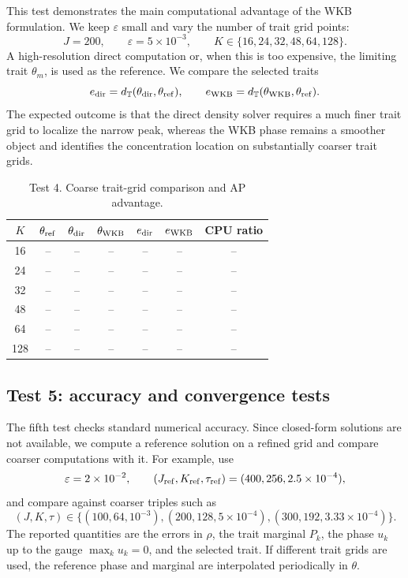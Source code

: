 \documentclass[11pt]{article}
\begin{document}
This test demonstrates the main computational advantage of the WKB formulation.  We keep \(\varepsilon\) small and vary the number of trait grid points:
\[
    J=200,
    \qquad
    \varepsilon=5\times10^{-3},
    \qquad
    K\in\{16,24,32,48,64,128\}.
\]
A high-resolution direct computation or, when this is too expensive, the limiting trait \(\theta_m\), is used as the reference.  We compare the selected traits
\[
    e_{\rm dir}=d_{\mathbb T}(\theta_{\rm dir},\theta_{\rm ref}),
    \qquad
    e_{\rm WKB}=d_{\mathbb T}(\theta_{\rm WKB},\theta_{\rm ref}).
\]
The expected outcome is that the direct density solver requires a much finer trait grid to localize the narrow peak, whereas the WKB phase remains a smoother object and identifies the concentration location on substantially coarser trait grids.

\begin{table}[ht]
\centering
\caption{Test 4. Coarse trait-grid comparison and AP advantage.}
\begin{tabular}{ccccccc}
\toprule
$K$ & $\theta_{\rm ref}$ & $\theta_{\rm dir}$ & $\theta_{\rm WKB}$ & $e_{\rm dir}$ & $e_{\rm WKB}$ & CPU ratio\\
\midrule
16 & -- & -- & -- & -- & -- & --\\
24 & -- & -- & -- & -- & -- & --\\
32 & -- & -- & -- & -- & -- & --\\
48 & -- & -- & -- & -- & -- & --\\
64 & -- & -- & -- & -- & -- & --\\
128 & -- & -- & -- & -- & -- & --\\
\bottomrule
\end{tabular}
\end{table}

\subsection{Test 5: accuracy and convergence tests}\label{subsec:test_accuracy_new}

The fifth test checks standard numerical accuracy.  Since closed-form solutions are not available, we compute a reference solution on a refined grid and compare coarser computations with it.  For example, use
\[
    \varepsilon=2\times10^{-2},
    \qquad
    (J_{\rm ref},K_{\rm ref},\tau_{\rm ref})=(400,256,2.5\times10^{-4}),
\]
and compare against coarser triples such as
\[
    (J,K,\tau)\in
    \{(100,64,10^{-3}), (200,128,5\times10^{-4}), (300,192,3.33\times10^{-4})\}.
\]
The reported quantities are the errors in \(\rho\), the trait marginal \(P_k\), the phase \(u_k\) up to the gauge \(\max_k u_k=0\), and the selected trait.  If different trait grids are used, the reference phase and marginal are interpolated periodically in \(\theta\).
\end{document}
